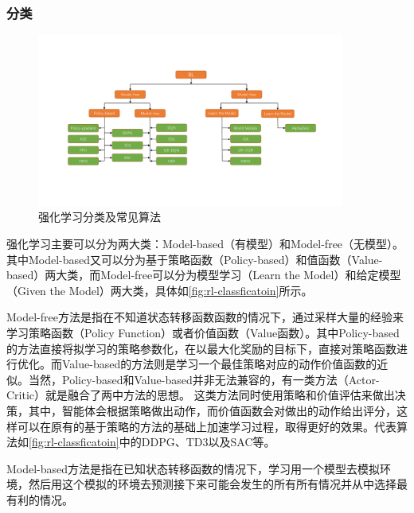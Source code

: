 \subsubsection{分类}
\begin{figure}[htb]
    \includegraphics[width=0.9\textwidth]{fig/rl-classfication.pdf}
    \caption{强化学习分类及常见算法}
    \label{fig:rl-classficatoin}
\end{figure}
强化学习主要可以分为两大类：Model-based（有模型）和Model-free（无模型）。其中Model-based又可以分为基于策略函数（Policy-based）和值函数（Value-based）两大类，而Model-free可以分为模型学习（Learn the Model）和给定模型（Given the Model）两大类，具体如\autoref{fig:rl-classficatoin}所示。

Model-free方法是指在不知道状态转移函数函数的情况下，通过采样大量的经验来学习策略函数（Policy Function）或者价值函数（Value函数）。其中Policy-based的方法直接将拟学习的策略参数化，在以最大化奖励的目标下，直接对策略函数进行优化。而Value-based的方法则是学习一个最佳策略对应的动作价值函数的近似。当然，Policy-based和Value-based并非无法兼容的，有一类方法（Actor-Critic）就是融合了两中方法的思想。
这类方法同时使用策略和价值评估来做出决策，其中，智能体会根据策略做出动作，而价值函数会对做出的动作给出评分，这样可以在原有的基于策略的方法的基础上加速学习过程，取得更好的效果。代表算法如\autoref{fig:rl-classficatoin}中的DDPG\cite{lillicrap2015continuous}、TD3\cite{fujimoto2018addressing}以及SAC\cite{haarnoja2018soft}等。

Model-based方法是指在已知状态转移函数的情况下，学习用一个模型去模拟环境，然后用这个模拟的环境去预测接下来可能会发生的所有所有情况并从中选择最有利的情况。

